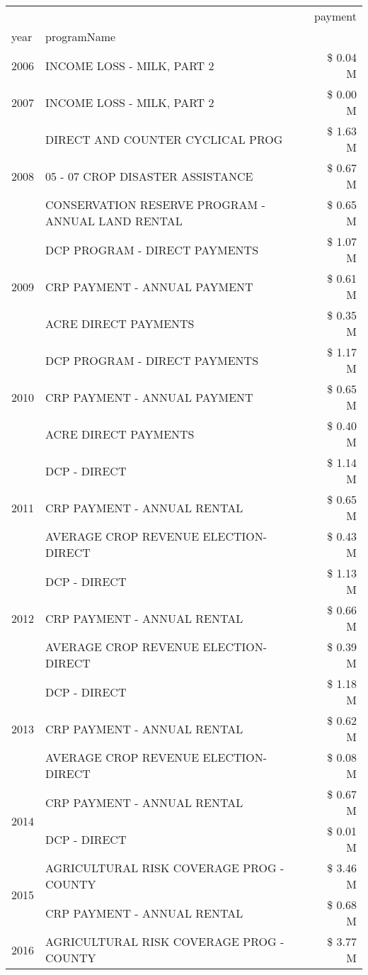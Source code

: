 \begin{tabular}{llr}
\toprule
 &  & payment \\
year & programName &  \\
\midrule
2006 & INCOME LOSS - MILK, PART 2 & \$ 0.04 M \\
\cline{1-3}
2007 & INCOME LOSS - MILK, PART 2 & \$ 0.00 M \\
\cline{1-3}
\multirow[t]{3}{*}{2008} & DIRECT AND COUNTER CYCLICAL PROG & \$ 1.63 M \\
 & 05 - 07 CROP DISASTER ASSISTANCE & \$ 0.67 M \\
 & CONSERVATION RESERVE PROGRAM - ANNUAL LAND RENTAL & \$ 0.65 M \\
\cline{1-3}
\multirow[t]{3}{*}{2009} & DCP PROGRAM - DIRECT PAYMENTS & \$ 1.07 M \\
 & CRP PAYMENT - ANNUAL PAYMENT & \$ 0.61 M \\
 & ACRE DIRECT PAYMENTS & \$ 0.35 M \\
\cline{1-3}
\multirow[t]{3}{*}{2010} & DCP PROGRAM - DIRECT PAYMENTS & \$ 1.17 M \\
 & CRP PAYMENT - ANNUAL PAYMENT & \$ 0.65 M \\
 & ACRE DIRECT PAYMENTS & \$ 0.40 M \\
\cline{1-3}
\multirow[t]{3}{*}{2011} & DCP - DIRECT & \$ 1.14 M \\
 & CRP PAYMENT - ANNUAL RENTAL & \$ 0.65 M \\
 & AVERAGE CROP REVENUE ELECTION-DIRECT & \$ 0.43 M \\
\cline{1-3}
\multirow[t]{3}{*}{2012} & DCP - DIRECT & \$ 1.13 M \\
 & CRP PAYMENT - ANNUAL RENTAL & \$ 0.66 M \\
 & AVERAGE CROP REVENUE ELECTION-DIRECT & \$ 0.39 M \\
\cline{1-3}
\multirow[t]{3}{*}{2013} & DCP - DIRECT & \$ 1.18 M \\
 & CRP PAYMENT - ANNUAL RENTAL & \$ 0.62 M \\
 & AVERAGE CROP REVENUE ELECTION-DIRECT & \$ 0.08 M \\
\cline{1-3}
\multirow[t]{2}{*}{2014} & CRP PAYMENT - ANNUAL RENTAL & \$ 0.67 M \\
 & DCP - DIRECT & \$ 0.01 M \\
\cline{1-3}
\multirow[t]{2}{*}{2015} & AGRICULTURAL RISK COVERAGE PROG - COUNTY & \$ 3.46 M \\
 & CRP PAYMENT - ANNUAL RENTAL & \$ 0.68 M \\
\cline{1-3}
\multirow[t]{3}{*}{2016} & AGRICULTURAL RISK COVERAGE PROG - COUNTY & \$ 3.77 M \\

\end{tabular}
